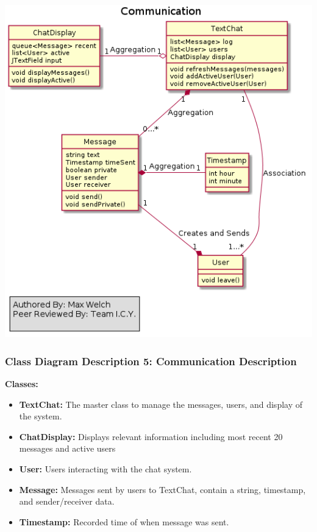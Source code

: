 \documentclass[twoside,letterpaper]{article}
\begin{document}
{\includegraphics[width=\textwidth]{images/ClassDiagrams/Communication}

\newpage
\subsubsection[Class Diagram Description 5: Communication Description]{\rmfamily\bfseries\color{black}
	Class Diagram Description 5: Communication Description}
\hypertarget{RefHeading22059017292}{}

\textbf{Classes:}
\begin{itemize}

	\item \textbf{TextChat:} The master class to manage the messages, users, and display of the system.
	\item \textbf{ChatDisplay:} Displays relevant information including most recent 20 messages and active users
	\item \textbf{User:} Users interacting with the chat system.
	\item \textbf{Message:} Messages sent by users to TextChat, contain a string, timestamp, and sender/receiver data.
	\item \textbf{Timestamp:} Recorded time of when message was sent.
\end{itemize}
\newpage

}
\end{document}
